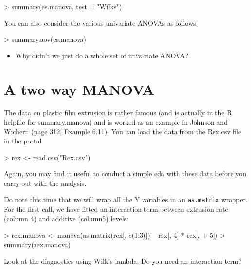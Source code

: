 \begin{Schunk}
\begin{Sinput}
> summary(es.manova, test = "Wilks")
\end{Sinput}
\end{Schunk}

You can also consider the various univariate ANOVAs as follows:

\begin{Schunk}
\begin{Sinput}
> summary.aov(es.manova)
\end{Sinput}
\end{Schunk}

\begin{itemize}
\item Why didn't we just do a whole set of univariate ANOVA?
\end{itemize}

\section{A two way MANOVA}

The data on plastic film extrusion is rather famous (and is actually in the R helpfile for summary.manova) and is worked as an example in Johnson and Wichern (page 312, Example 6.11).  You can load the data from the Rex.csv file in the portal.

\begin{Schunk}
\begin{Sinput}
> rex <- read.csv("Rex.csv")
\end{Sinput}
\end{Schunk}

Again, you may find it useful to conduct a simple eda with these data before you carry out with the analysis.

Do note this time that we will wrap all the Y variables in an \texttt{as.matrix} wrapper.   For the first call, we have fitted an interaction term between extrusion rate (column 4) and additive (column5) levels:

\begin{Schunk}
\begin{Sinput}
> rex.manova <- manova(as.matrix(rex[, c(1:3)]) ~ rex[, 4] * rex[, 
+     5])
> summary(rex.manova)
\end{Sinput}
\end{Schunk}

Look at the diagnostics using Wilk's lambda.   Do you need an interaction term?

